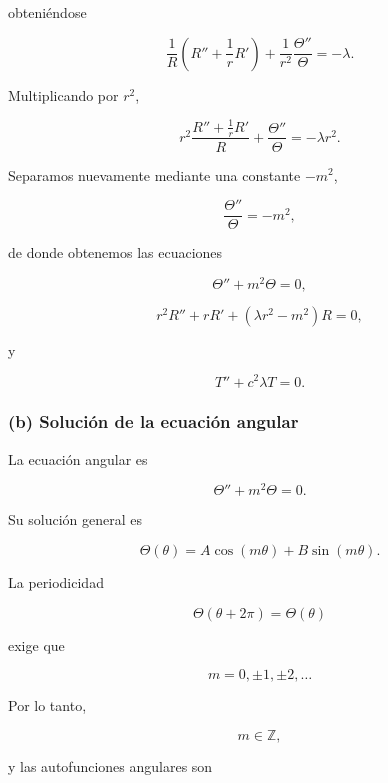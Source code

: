 \documentclass[12pt]{article}
\begin{document}
obteniéndose

\begin{equation}
\frac1R
\left(
R''+\frac1rR'
\right)
+
\frac1{r^2}
\frac{\Theta''}{\Theta}
=
-\lambda.
\end{equation}

Multiplicando por $r^2$,

\[
r^2
\frac{R''+\frac1rR'}{R}
+
\frac{\Theta''}{\Theta}
=
-\lambda r^2.
\]

Separamos nuevamente mediante una constante $-m^2$,

\begin{equation}
\frac{\Theta''}{\Theta}
=
-m^2,
\end{equation}

de donde obtenemos las ecuaciones

\begin{equation}
\boxed{
\Theta''+m^2\Theta=0,
}
\end{equation}

\begin{equation}
\boxed{
r^2R''
+rR'
+
(\lambda r^2-m^2)R=0,
}
\end{equation}

y

\begin{equation}
\boxed{
T''+c^2\lambda T=0.
}
\end{equation}

\subsubsection*{(b) Solución de la ecuación angular}

La ecuación angular es

\[
\Theta''+m^2\Theta=0.
\]

Su solución general es

\begin{equation}
\Theta(\theta)
=
A\cos(m\theta)
+
B\sin(m\theta).
\end{equation}

La periodicidad

\[
\Theta(\theta+2\pi)=\Theta(\theta)
\]

exige que

\[
m=0,\pm1,\pm2,\ldots
\]

Por lo tanto,

\begin{equation}
\boxed{
m\in\mathbb Z,
}
\end{equation}

y las autofunciones angulares son
\end{document}
